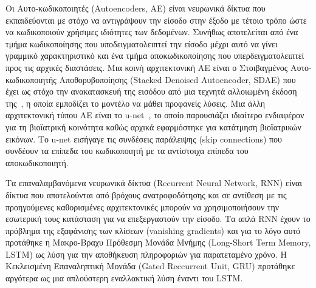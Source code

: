Οι Αυτο-κωδικοποιητές (Autoencoders, AE) είναι νευρωνικά δίκτυα που εκπαιδεύονται με στόχο να αντιγράψουν την είσοδο στην έξοδο με τέτοιο τρόπο ώστε να κωδικοποιούν χρήσιμες ιδιότητες των δεδομένων.
Συνήθως αποτελείται από ένα τμήμα κωδικοποίησης που υποδειγματολειπτεί την είσοδο μέχρι αυτό να γίνει γραμμικό χαρακτηριστικό και ένα τμήμα αποκωδικοποίησης που υπερδειγματολειπτεί προς τις αρχικές διαστάσεις.
Μια κοινή αρχιτεκτονική AE είναι ο Στοιβαγμένος Αυτο-κωδικοποιητής Αποθορυβοποίησης (Stacked Denoised Autoencoder, SDAE) που έχει ως στόχο την ανακατασκευή της εισόδου από μια τεχνητά αλλοιωμένη έκδοση της~\cite{vincent2010stacked}, η οποία εμποδίζει το μοντέλο να μάθει προφανείς λύσεις.
Μια άλλη αρχιτεκτονική τύπου AE είναι το u-net~\cite{ronneberger2015u}, το οποίο παρουσιάζει ιδιαίτερο ενδιαφέρον για τη βιοϊατρική κοινότητα καθώς αρχικά εφαρμόστηκε για κατάτμηση βιοϊατρικών εικόνων.
Το u-net εισήγαγε τις συνδέσεις παράλειψης (skip connections) που συνδέουν τα επίπεδα του κωδικοποιητή με τα αντίστοιχα επίπεδα του αποκωδικοποιητή.

Τα επαναλαμβανόμενα νευρωνικά δίκτυα (Recurrent Neural Network, RNN) είναι δίκτυα που αποτελούνται από βρόχους ανατροφοδότησης και σε αντίθεση με τις προηγούμενες καθορισμένες αρχιτεκτονικές μπορούν να χρησιμοποιήσουν την εσωτερική τους κατάσταση για να επεξεργαστούν την είσοδο.
Τα απλά RNN έχουν το πρόβλημα της εξαφάνισης των κλίσεων (vanishing gradients) και για το λόγο αυτό προτάθηκε η Μακρο-Βραχυ Πρόθεσμη Μονάδα Μνήμης (Long-Short Term Memory, LSTM) ως λύση για την αποθήκευση πληροφοριών για παρατεταμένο χρόνο.
Η Κεκλεισμένη Επαναληπτική Μονάδα (Gated Reccurrent Unit, GRU) προτάθηκε αργότερα ως μια απλούστερη εναλλακτική λύση έναντι του LSTM\@.

\clearpage



